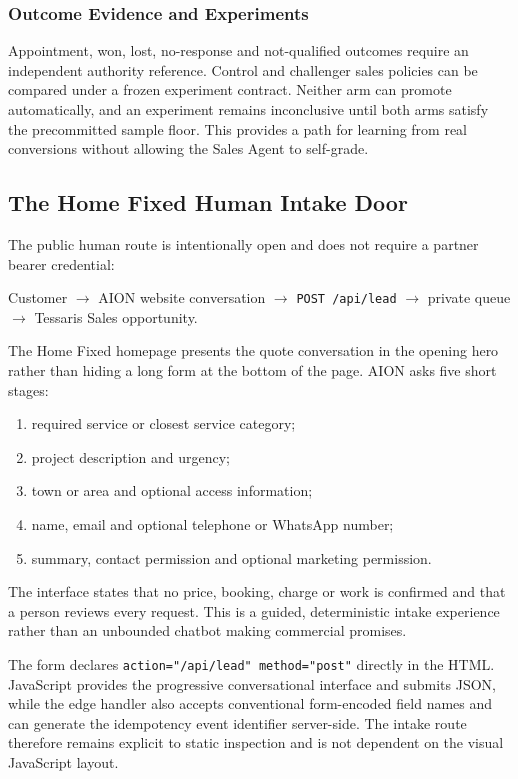 \subsubsection{Outcome Evidence and Experiments}

Appointment, won, lost, no-response and not-qualified outcomes require an independent authority reference.  Control and challenger sales policies can be compared under a frozen experiment contract.  Neither arm can promote automatically, and an experiment remains inconclusive until both arms satisfy the precommitted sample floor.  This provides a path for learning from real conversions without allowing the Sales Agent to self-grade.

\subsection{The Home Fixed Human Intake Door}

The public human route is intentionally open and does not require a partner bearer credential:

\begin{center}
Customer $\rightarrow$ AION website conversation $\rightarrow$ \texttt{POST /api/lead} $\rightarrow$ private queue $\rightarrow$ Tessaris Sales opportunity.
\end{center}

The Home Fixed homepage presents the quote conversation in the opening hero rather than hiding a long form at the bottom of the page.  AION asks five short stages:

\begin{enumerate}
  \item required service or closest service category;
  \item project description and urgency;
  \item town or area and optional access information;
  \item name, email and optional telephone or WhatsApp number;
  \item summary, contact permission and optional marketing permission.
\end{enumerate}

The interface states that no price, booking, charge or work is confirmed and that a person reviews every request.  This is a guided, deterministic intake experience rather than an unbounded chatbot making commercial promises.

The form declares \texttt{action="/api/lead" method="post"} directly in the HTML.  JavaScript provides the progressive conversational interface and submits JSON, while the edge handler also accepts conventional form-encoded field names and can generate the idempotency event identifier server-side.  The intake route therefore remains explicit to static inspection and is not dependent on the visual JavaScript layout.

